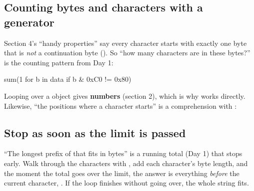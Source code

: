 \documentclass[10pt,a4paper]{article}
\begin{document}
\subsection{Counting bytes and characters with a generator}
Section 4’s “handy properties” say every character starts with exactly one byte that is \emph{not} a continuation byte (). So “how many characters are in these bytes?” is the counting pattern from Day 1:
\begin{pycode}
sum(1 for b in data if b & 0xC0 != 0x80)
\end{pycode}
Looping over a  object gives \textbf{numbers} (section 2), which is why  works directly.
Likewise, “the positions where a character starts” is a comprehension with :
\begin{pycode}
[i for i, b in enumerate(data) if b & 0xC0 != 0x80]
\end{pycode}
\subsection{Stop as soon as the limit is passed}
“The longest prefix of  that fits in  bytes” is a running total (Day 1) that stops early. Walk through the characters with , add each character’s byte length, and the moment the total goes over the limit, the answer is everything \emph{before} the current character, . If the loop finishes without going over, the whole string fits.
\end{document}
